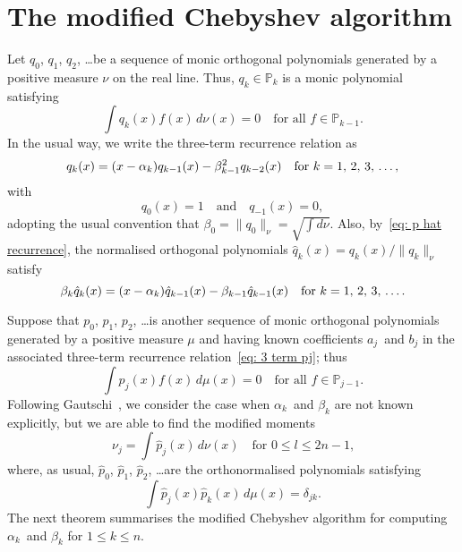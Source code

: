 \documentclass[12pt,a4paper]{article}
\newcommand{\Poly}{\mathbb{P}}
\begin{document}
\section{The modified Chebyshev algorithm}

Let $q_0$, $q_1$, $q_2$, \dots be a sequence of monic orthogonal 
polynomials generated by a positive measure $\nu$ on the real line.  
Thus, $q_k\in\Poly_k$ is a monic polynomial satisfying 
\[
\int q_k(x)f(x)\,d\nu(x)=0\quad\text{for all $f\in\Poly_{k-1}$.}
\]
In the usual way, we write the three-term recurrence relation as
\begin{equation}\label{eq: 3 term q}
q_k(x)=(x-\alpha_k)q_{k-1}(x)-\beta_{k-1}^2 q_{k-2}(x)
	\quad\text{for $k=1$, $2$, $3$, \dots,}
\end{equation}
with
\[
q_0(x)=1\quad\text{and}\quad q_{-1}(x)=0,
\]
adopting the usual convention that $\beta_0=\|q_0\|_\nu=\sqrt{\int d\nu}$.  
Also, by~\eqref{eq: p hat recurrence}, the normalised orthogonal polynomials
$\hat q_k(x)=q_k(x)/\|q_k\|_\nu$ satisfy
\begin{equation}\label{eq: q hat recurrence}
\beta_k\hat q_k(x)=(x-\alpha_k)\hat q_{k-1}(x)-\beta_{k-1}\hat q_{k-1}(x)
\quad\text{for $k=1$, $2$, $3$, \dots.}
\end{equation}

Suppose that $p_0$, $p_1$, $p_2$, \dots is another sequence of monic 
orthogonal polynomials generated by a positive measure $\mu$ and 
having known coefficients $a_j$~and $b_j$ in the associated 
three-term recurrence relation~\eqref{eq: 3 term pj}; thus
\[
\int p_j(x)f(x)\,d\mu(x)=0\quad\text{for all $f\in\Poly_{j-1}$.}
\]
Following Gautschi~\cite{Gautschi1982}, we consider the case when 
$\alpha_k$~and $\beta_k$ are not known explicitly, but we are able to 
find the modified moments
\[
\nu_j=\int\hat p_j(x)\,d\nu(x)\quad\text{for $0\le l\le 2n-1$,}
\]
where, as usual, $\hat p_0$, $\hat p_1$, $\hat p_2$, \dots are the 
orthonormalised polynomials satisfying
\[
\int\hat p_j(x)\hat p_k(x)\,d\mu(x)=\delta_{jk}.
\]
The next theorem summarises the modified Chebyshev algorithm for 
computing $\alpha_k$~and $\beta_k$ for $1\le k\le n$.
\end{document}
